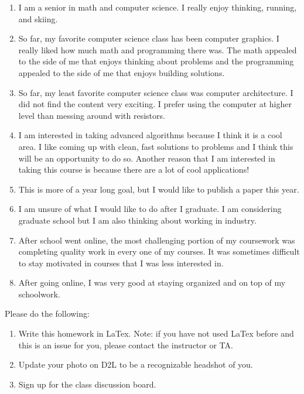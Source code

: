 \documentclass{article}
\begin{document}
\begin{enumerate}
    \item I am a senior in math and computer science.
    I really enjoy thinking, running, and skiing.
    \item So far, my favorite computer science class has been computer graphics.
    I really liked how much math and programming there was.
    The math appealed to the side of me that enjoys thinking about problems and the programming appealed to the side of me that enjoys building solutions.
    \item So far, my least favorite computer science class was computer architecture.
    I did not find the content very exciting.
    I prefer using the computer at higher level than messing around with resistors.
    \item I am interested in taking advanced algorithms because I think it is a cool area.
    I like coming up with clean, fast solutions to problems and I think this will be an opportunity to do so.
    Another reason that I am interested in taking this course is because there are a lot of cool applications!
    \item This is more of a year long goal, but I would like to publish a paper this year.
    \item I am unsure of what I would like to do after I graduate.
    I am considering graduate school but I am also thinking about working in industry.
    \item After school went online, the most challenging portion of my coursework was completing quality work in every one of my courses.
    It was sometimes difficult to stay motivated in courses that I was less interested in.
    \item After going online, I was very good at staying organized and on top of my schoolwork.
\end{enumerate}


\nextprob
{}

Please do the following:
\begin{enumerate}
    \item Write this homework in LaTex.
        Note: if you have not used LaTex before and this is an
        issue for you, please contact the instructor or TA.
    \item Update your photo on D2L to be a recognizable headshot of you.
    \item Sign up for the class discussion board.
\end{enumerate}
\end{document}
